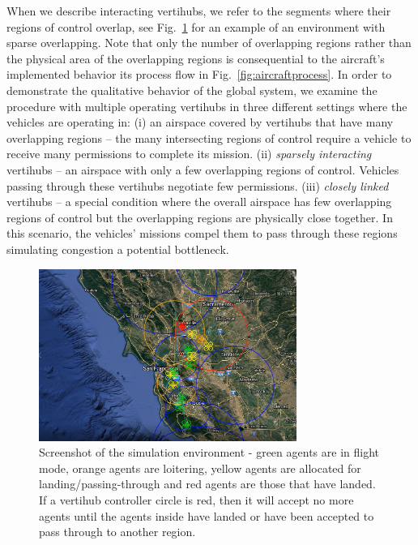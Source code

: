 \label{ssec:SimSet}
When we describe interacting vertihubs, we refer to the segments where their regions of control overlap, see Fig.~\ref{fig:sim} for an example of an environment with sparse overlapping. Note that only the number of overlapping regions rather than the physical area of the overlapping regions is consequential to the aircraft's implemented behavior its process flow in Fig.~\ref{fig:aircraftprocess}.
In order to demonstrate the qualitative behavior of the global system, we examine the procedure with multiple operating vertihubs in three different settings where the vehicles are operating in: 
(i) an airspace covered by vertihubs that have many overlapping regions -- the many intersecting regions of control require a vehicle to receive many permissions to complete its mission.
(ii) \emph{sparsely interacting} vertihubs -- an airspace with only a few overlapping regions of control. Vehicles passing through these vertihubs negotiate few permissions.
 (iii) \emph{closely linked} vertihubs -- a special condition where the overall airspace has few overlapping regions of control but the overlapping regions are physically close together. In this scenario, the vehicles' missions compel them to pass through these regions simulating congestion a potential bottleneck. 

\begin{figure}
	\centering
	\includegraphics[width=0.75\textwidth]{UAM-TCNS/Towers.PNG}
	\caption[Screenshot of the UAM operations simulation environment ]{Screenshot of the simulation environment - green agents are in flight mode, orange agents are loitering, yellow agents are allocated for landing/passing-through and red agents are those that have landed. If a vertihub controller circle is red, then it will accept no more agents until the agents inside have landed or have been accepted to pass through to another region.
	}
	\label{fig:sim}
\end{figure}

